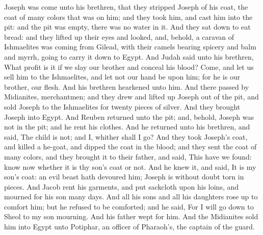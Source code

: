 Joseph was come unto his brethren, that they stripped Joseph of his coat, the coat of many colors that was on him; and they took him, and cast him into the pit: and the pit was empty, there was no water in it.  And they sat down to eat bread: and they lifted up their eyes and looked, and, behold, a caravan of Ishmaelites was coming from Gilead, with their camels bearing spicery and balm and myrrh, going to carry it down to Egypt. And Judah said unto his brethren, What profit is it if we slay our brother and conceal his blood? Come, and let us sell him to the Ishmaelites, and let not our hand be upon him; for he is our brother, our flesh. And his brethren hearkened unto him. And there passed by Midianites, merchantmen; and they drew and lifted up Joseph out of the pit, and sold Joseph to the Ishmaelites for twenty pieces of silver. And they brought Joseph into Egypt.  And Reuben returned unto the pit; and, behold, Joseph was not in the pit; and he rent his clothes. And he returned unto his brethren, and said, The child is not; and I, whither shall I go? And they took Joseph’s coat, and killed a he-goat, and dipped the coat in the blood; and they sent the coat of many colors, and they brought it to their father, and said, This have we found: know now whether it is thy son’s coat or not. And he knew it, and said, It is my son’s coat: an evil beast hath devoured him; Joseph is without doubt torn in pieces. And Jacob rent his garments, and put sackcloth upon his loins, and mourned for his son many days. And all his sons and all his daughters rose up to comfort him; but he refused to be comforted; and he said, For I will go down to Sheol to my son mourning. And his father wept for him. And the Midianites sold him into Egypt unto Potiphar, an officer of Pharaoh’s, the captain of the guard. 

